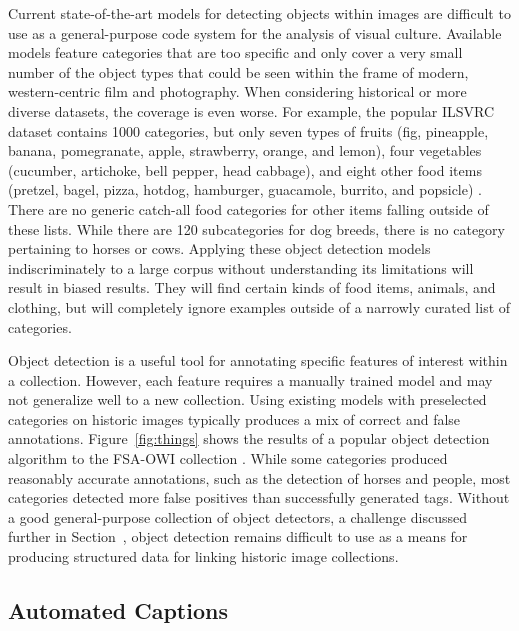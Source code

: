 \documentclass[10pt, a4paper]{article}
\newcommand{\secref}[1]{\StrSubstitute{\getrefnumber{#1}}{.}{ }}
\begin{document}
Current state-of-the-art models for detecting objects within images are difficult
to use as a general-purpose code system for the analysis of visual culture.
Available models feature categories that are too specific and only cover
a very small number of the object types that could be seen within the frame
of modern, western-centric film and photography. When considering historical
or more diverse datasets, the coverage is even worse. For example, the popular
ILSVRC dataset contains 1000 categories, but only seven types of fruits
(fig, pineapple, banana, pomegranate, apple, strawberry, orange, and lemon),
four vegetables (cucumber, artichoke, bell pepper, head cabbage), and eight
other food items (pretzel, bagel, pizza, hotdog, hamburger, guacamole, burrito,
and popsicle) \cite{russakovsky2015imagenet}. There are no generic catch-all
food categories for other items falling outside of these lists. While there are
120 subcategories for dog breeds, there is no category pertaining to horses or
cows. Applying these object detection models indiscriminately to a large corpus
without understanding its limitations will result in biased results. They will
find certain kinds of food items, animals, and clothing, but will completely
ignore examples outside of a narrowly curated  list of categories.

Object detection is a useful tool for annotating specific features of interest
within a collection. However, each feature requires a manually trained model
and may not generalize well to a new collection. Using existing models with
preselected categories on historic images typically produces a mix of
correct and false annotations. Figure~\ref{fig:things} shows the results
of a popular object detection algorithm to the FSA-OWI collection
\cite{wu2019detectron2}. While some categories produced reasonably accurate
annotations, such as the detection of horses and people, most categories detected
more false positives than successfully generated tags. Without a good general-purpose
collection of object detectors, a challenge discussed further in
Section~\secref{sec:conclude}, object detection remains difficult to use as a means
for producing structured data for linking historic image collections.

\subsection{Automated Captions}
\end{document}
